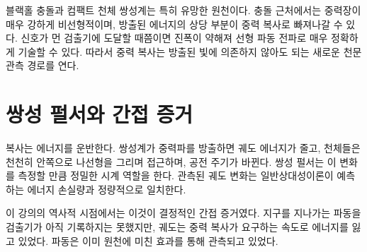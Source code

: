 \begin{classroomqa}
\end{classroomqa}

블랙홀 충돌과 컴팩트 천체 쌍성계는 특히 유망한 원천이다. 충돌 근처에서는 중력장이 매우 강하게 비선형적이며, 방출된 에너지의 상당 부분이 중력 복사로 빠져나갈 수 있다. 신호가 먼 검출기에 도달할 때쯤이면 진폭이 약해져 선형 파동 전파로 매우 정확하게 기술할 수 있다. 따라서 중력 복사는 방출된 빛에 의존하지 않아도 되는 새로운 천문 관측 경로를 연다.

\section{쌍성 펄서와 간접 증거}

복사는 에너지를 운반한다. 쌍성계가 중력파를 방출하면 궤도 에너지가 줄고, 천체들은 천천히 안쪽으로 나선형을 그리며 접근하며, 공전 주기가 바뀐다. 쌍성 펄서는 이 변화를 측정할 만큼 정밀한 시계 역할을 한다. 관측된 궤도 변화는 일반상대성이론이 예측하는 에너지 손실량과 정량적으로 일치한다.

이 강의의 역사적 시점에서는 이것이 결정적인 간접 증거였다. 지구를 지나가는 파동을 검출기가 아직 기록하지는 못했지만, 궤도는 중력 복사가 요구하는 속도로 에너지를 잃고 있었다. 파동은 이미 원천에 미친 효과를 통해 관측되고 있었다.

\begin{classroomqa}
\end{classroomqa}

\begin{classroomqa}
\end{classroomqa}

